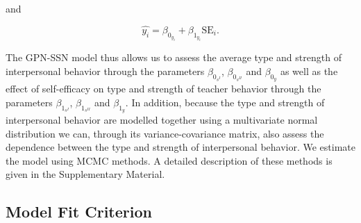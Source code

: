 \documentclass[man,mask]{apa6}
\begin{document}
\noindent and

\[\hat{y_i} = \beta_{0_{y_i}} +
\beta_{1_{y_i}}\text{SE}_i.\]

\noindent The GPN-SSN model thus allows us to assess the average type and
strength of interpersonal behavior through the parameters \(\beta_{0_{s^{I}}}\),
\(\beta_{0_{s^{II}}}\) and \(\beta_{0_{y}}\) as well as the effect of self-efficacy
on type and strength of teacher behavior through the parameters
\(\beta_{1_{s^{I}}}\), \(\beta_{1_{s^{II}}}\) and \(\beta_{1_{y}}\). In addition,
because the type and strength of interpersonal behavior are modelled together
using a multivariate normal distribution we can, through its variance-covariance
matrix, also assess the dependence between the type and strength of interpersonal
behavior. \newpage
\indent We estimate the model using MCMC methods. A detailed description of these
methods is given in the Supplementary Material.

\vspace{-0.75cm}
\subsection{Model Fit Criterion}\label{Modelfit}
\vspace{-0.75cm}
\end{document}
